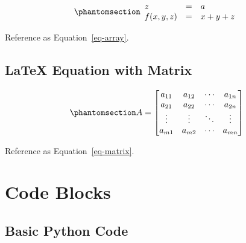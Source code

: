 \documentclass[
  letterpaper,
  oneside,
  openany]{MastersDoctoralThesis}
\newenvironment{Shaded}{\begin{snugshade}}{\end{snugshade}}
\newcommand{\NormalTok}[1]{\textcolor[rgb]{0.00,0.23,0.31}{#1}}
\theoremstyle{plain}
\theoremstyle{remark}
\begin{document}
\begin{equation}\phantomsection\label{eq-array}{
\begin{array}{lcl}
z & = & a \\
f(x,y,z) & = & x + y + z
\end{array}
}\end{equation}

Reference as Equation~\ref{eq-array}.

\subsection*{LaTeX Equation with
Matrix}\label{latex-equation-with-matrix}

\begin{equation}\phantomsection\label{eq-matrix}{
A = 
\begin{bmatrix} 
a_{11} & a_{12} & \cdots & a_{1n} \\
a_{21} & a_{22} & \cdots & a_{2n} \\
\vdots & \vdots & \ddots & \vdots \\
a_{m1} & a_{m2} & \cdots & a_{mn}
\end{bmatrix}
}\end{equation}

Reference as Equation~\ref{eq-matrix}.

\section*{Code Blocks}\label{sec-code}


\subsection*{Basic Python Code}\label{basic-python-code}

\begin{codelisting}

\caption{\label{lst-basic}}

\centering{

\begin{Shaded}
\begin{Highlighting}[]
\NormalTok{25°C is equal to 77.0°F}
\end{Highlighting}
\end{Shaded}

}

\end{codelisting}%
\end{document}

